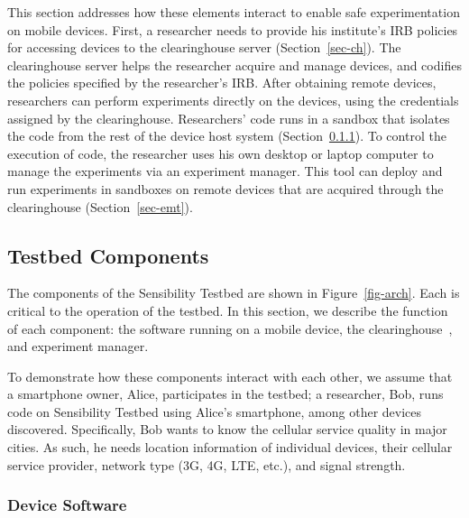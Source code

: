 This section addresses how these elements interact to
enable safe experimentation on mobile devices. First, 
a researcher needs to provide his institute's 
IRB policies for accessing devices to the clearinghouse 
server (Section~\ref{sec-ch}).  
The clearinghouse server helps the researcher acquire and manage
devices, and codifies the policies specified by the
researcher's IRB. 
After obtaining remote devices, researchers can perform
experiments directly on the devices, using the credentials assigned by
the clearinghouse. Researchers' code runs in a sandbox 
that isolates the code from the rest of the device
host system (Section~\ref{sec-repy}). To control the execution of 
code, the researcher uses his own desktop or laptop computer to manage the 
experiments via an experiment manager. This tool can deploy 
and run experiments in sandboxes on remote devices that are 
acquired through the clearinghouse (Section~\ref{sec-emt}).



\subsection{Testbed Components}\label{sec-component}

The components of the Sensibility Testbed are shown in Figure~\ref{fig-arch}.
Each is critical to the operation of the testbed. 
In this section, we describe the function of each component: the
software running on a mobile device, the clearinghouse~\cite{ch}, 
and experiment manager.

To demonstrate how these components interact with each other, we assume 
that a smartphone owner, Alice, participates in the testbed; a researcher, Bob, 
runs code on Sensibility Testbed using Alice's smartphone, among other
devices discovered. Specifically, Bob wants to know the cellular service
quality in major cities. As such, he needs location information
of individual devices, their cellular service provider, network
type (3G, 4G, LTE, etc.), and signal strength.

\subsubsection{Device Software}\label{sec-repy}

